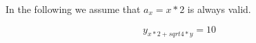 
In the following we assume that 
$ a_x = x * 2 $
is always valid.

\begin{equation}
  y_{x*2 + sqrt{4*y}} = 10
\end{equation}

